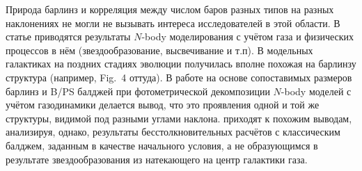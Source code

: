 \documentclass{trlnotes}
\begin{document}
Природа барлинз и корреляция между числом баров разных типов на разных наклонениях не могли не вызывать интереса исследователей в этой области.  В статье \citet{athanassoula2013a} приводятся результаты $N$-body моделирования с учётом газа и физических процессов в нём (звездообразование, высвечивание и т.п). В модельных галактиках на поздних стадиях эволюции  получилась вполне похожая на барлинзу структура (например, Fig.~4 оттуда). В работе  \citet{athanassoula2015} на основе сопоставимых размеров барлинз и B/PS балджей при фотометрической декомпозиции $N$-body моделей с учётом газодинамики делается вывод, что это проявления одной и той же структуры, видимой под разными углами наклона. \citet{salo2017} приходят к похожим выводам, анализируя, однако, результаты бесстолкновительных расчётов с классическим балджем, заданным в качестве начального условия, а не образующимся в результате звездообразования из  натекающего на центр галактики газа. 
\end{document}
